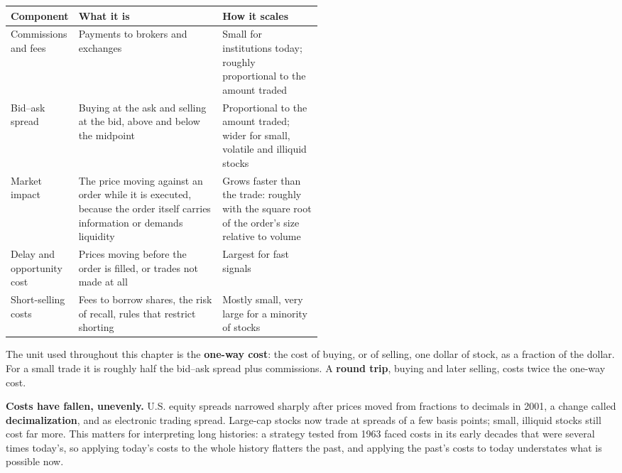 \begin{center}
\small
\begin{tabularx}{0.9\linewidth}{@{}>{\raggedright\arraybackslash}p{0.19\linewidth}>{\raggedright\arraybackslash}X>{\raggedright\arraybackslash}p{0.32\linewidth}@{}}
\toprule
Component & What it is & How it scales \\
\midrule
Commissions and fees & Payments to brokers and exchanges & Small for institutions today; roughly proportional to the amount traded \\
Bid--ask spread & Buying at the ask and selling at the bid, above and below the midpoint & Proportional to the amount traded; wider for small, volatile and illiquid stocks \\
Market impact & The price moving against an order while it is executed, because the order itself carries information or demands liquidity & Grows faster than the trade: roughly with the square root of the order's size relative to volume \\
Delay and opportunity cost & Prices moving before the order is filled, or trades not made at all & Largest for fast signals \\
Short-selling costs & Fees to borrow shares, the risk of recall, rules that restrict shorting & Mostly small, very large for a minority of stocks \\
\bottomrule
\end{tabularx}
\end{center}

The unit used throughout this chapter is the \textbf{one-way cost}: the cost of buying, or of selling, one dollar of stock, as a fraction of the dollar. For a small trade it is roughly half the bid--ask spread plus commissions. A \textbf{round trip}, buying and later selling, costs twice the one-way cost.

\textbf{Costs have fallen, unevenly.} U.S. equity spreads narrowed sharply after prices moved from fractions to decimals in 2001, a change called \textbf{decimalization}, and as electronic trading spread. Large-cap stocks now trade at spreads of a few basis points; small, illiquid stocks still cost far more. This matters for interpreting long histories: a strategy tested from 1963 faced costs in its early decades that were several times today's, so applying today's costs to the whole history flatters the past, and applying the past's costs to today understates what is possible now.

